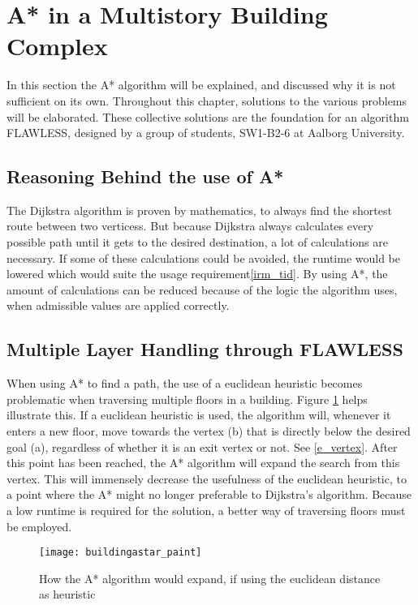 \section{A* in a Multistory Building Complex}

In this section the A* algorithm will be explained, and discussed why it is not sufficient on its own. Throughout this chapter, solutions to the various problems will be elaborated. These collective solutions are the foundation for an algorithm FLAWLESS, designed by a group of students, SW1-B2-6 at Aalborg University. 

\subsection{Reasoning Behind the use of A*}
The Dijkstra algorithm is proven by mathematics, to always find the shortest route between two verticess. But because Dijkstra always calculates every possible path until it gets to the desired destination, a lot of calculations are necessary. If some of these calculations could be avoided, the runtime would be lowered which would suite the usage requirement\cref{irm_tid}. By using A*, the amount of calculations can be reduced because of the logic the algorithm uses, when admissible values are applied correctly.

\subsection{Multiple Layer Handling through FLAWLESS} \label{multlayhan}

When using A* to find a path, the use of a euclidean heuristic becomes problematic when traversing multiple floors in a building. Figure \ref{fig:buildingAstar} helps illustrate this. If a euclidean heuristic is used, the algorithm will, whenever it enters a new floor, move towards the vertex (b) that is directly below the desired goal (a), regardless of whether it is an exit vertex or not. See \cref{e_vertex}. After this point has been reached, the A* algorithm will expand the search from this vertex. This will immensely decrease the usefulness of the euclidean heuristic, to a point where the A* might no longer preferable to Dijkstra's algorithm. Because a low runtime is required for the solution, a better way of traversing floors must be employed.

\begin{figure}[ht!]
    \centering
    \texttt{[image: buildingastar\_paint]}
    \caption{How the A* algorithm would expand, if using the euclidean distance as heuristic}
    \label{fig:buildingAstar}
  \end{figure}

